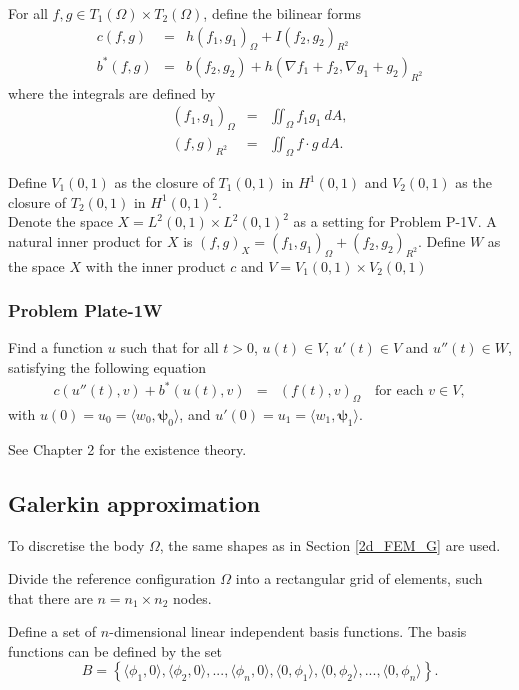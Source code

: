 \documentclass[../../main.tex]{subfiles}
\begin{document}
For all $f,g \in T_1(\Omega)\times T_2(\Omega) $, define the bilinear forms
\begin{eqnarray*}
	c(f,g) & = & h(f_1,g_1)_{\Omega} + I(f_2,g_2)_{R^2} \\
	b^*(f,g) & = & b(f_2,g_2) + h(\nabla f_1 + f_2, \nabla g_1 + g_2)_{R^2}
\end{eqnarray*}
where the integrals are defined by
\begin{eqnarray*}
	(f_1,g_1)_{\Omega} & = & \iint_\Omega f_1 g_1 \ dA,\\
	(f,g)_{R^2} & = & \iint_\Omega f \cdot g \ dA.
\end{eqnarray*}

Define $V_1(0,1)$ as the closure of $T_1(0,1)$ in $H^1(0,1)$ and $V_2(0,1)$ as the closure of $T_2(0,1)$ in $H^1(0,1)^2$.\\

Denote the space $X = L^2(0,1)\times L^2(0,1)^2$ as a setting for Problem P-1V. A natural inner product for $X$ is $(f,g)_X = (f_1,g_1)_{\Omega} + (f_2,g_2)_{R^2}$.  Define $W$ as the space $X$ with the inner product $c$ and $V = V_1(0,1) \times V_2(0,1)$

\subsubsection{Problem Plate-1W}
Find a function $u$ such that for all $t>0$, $u(t) \in V$, $u'(t) \in V$ and $u''(t) \in W$, satisfying the following equation
\begin{eqnarray}
	c(u''(t),v) + b^*(u(t),v) & = & (f(t),v)_{\Omega} \ \ \ \textrm{ for each } v \in V,
\end{eqnarray} with $u(0)= u_0 = \langle w_0, \boldsymbol\psi_0 \rangle$, and $u'(0)= u_1 = \langle w_1, \boldsymbol\psi_1 \rangle$.

See Chapter 2 for the existence theory.

\subsection{Galerkin approximation}
To discretise the body $\Omega$, the same shapes as in Section \ref{2d_FEM_G} are used.

Divide the reference configuration $\Omega$ into a rectangular grid of elements, such that there are $n = n_1 \times n_2$ nodes.

Define a set of $n$-dimensional linear independent basis functions. The basis functions can be defined by the set $$B = \left\{\langle\phi_1, 0\rangle, \langle\phi_2, 0\rangle,...,\langle\phi_{n}, 0 \rangle,\langle 0,\phi_1\rangle,\langle 0 ,\phi_2\rangle,...,\langle 0,\phi_{n}\rangle \right\}.$$ 
\end{document}
